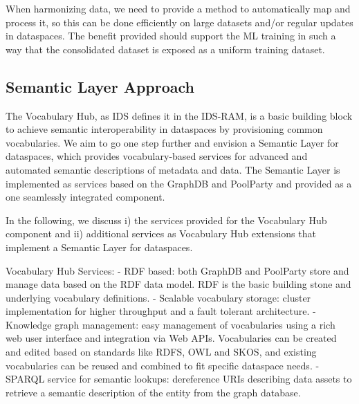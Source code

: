\documentclass[manuscript,screen]{acmart}
\begin{document}
When harmonizing data, we need to provide a method to automatically map
and process it, so this can be done efficiently on large datasets and/or
regular updates in dataspaces. The benefit provided should support the
ML training in such a way that the consolidated dataset is exposed as a
uniform training dataset.

\subsection{Semantic Layer Approach}\label{semantic-layer-approach}

The Vocabulary Hub, as IDS defines it in the IDS-RAM, is a basic
building block to achieve semantic interoperability in dataspaces by
provisioning common vocabularies. We aim to go one step further and
envision a Semantic Layer for dataspaces, which provides
vocabulary-based services for advanced and automated semantic
descriptions of metadata and data. The Semantic Layer is implemented as
services based on the GraphDB and PoolParty and provided as a one
seamlessly integrated component.

In the following, we discuss i) the services provided for the Vocabulary
Hub component and ii) additional services as Vocabulary Hub extensions
that implement a Semantic Layer for dataspaces.

Vocabulary Hub Services: - RDF based: both GraphDB and PoolParty store
and manage data based on the RDF data model. RDF is the basic building
stone and underlying vocabulary definitions. - Scalable vocabulary
storage: cluster implementation for higher throughput and a fault
tolerant architecture. - Knowledge graph management: easy management of
vocabularies using a rich web user interface and integration via Web
APIs. Vocabularies can be created and edited based on standards like
RDFS, OWL and SKOS, and existing vocabularies can be reused and combined
to fit specific dataspace needs. - SPARQL service for semantic lookups:
dereference URIs describing data assets to retrieve a semantic
description of the entity from the graph database.
\end{document}
